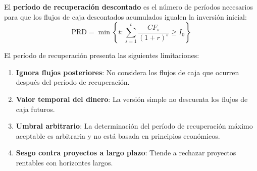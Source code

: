 \begin{definicion}
El \textbf{período de recuperación descontado} es el número de períodos necesarios para que los flujos de caja descontados acumulados igualen la inversión inicial:
\begin{equation}
\text{PRD} = \min\left\{t : \sum_{s=1}^{t} \frac{CF_s}{(1+r)^s} \geq I_0\right\}
\end{equation}
\end{definicion}

\begin{center}
    
\end{center}

\begin{proposicion}
El período de recuperación presenta las siguientes limitaciones:

\begin{enumerate}
\item \textbf{Ignora flujos posteriores}: No considera los flujos de caja que ocurren después del período de recuperación.

\item \textbf{Valor temporal del dinero}: La versión simple no descuenta los flujos de caja futuros.

\item \textbf{Umbral arbitrario}: La determinación del período de recuperación máximo aceptable es arbitraria y no está basada en principios económicos.

\item \textbf{Sesgo contra proyectos a largo plazo}: Tiende a rechazar proyectos rentables con horizontes largos.
\end{enumerate}
\end{proposicion}

